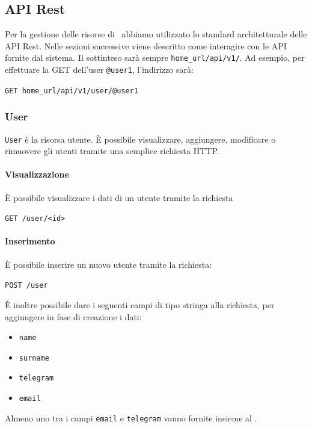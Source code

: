 \subsection{API Rest}\label{APIRest}
\newcommand{\homeUrl}{home\_url}

Per la gestione delle risorse di \progetto\ abbiamo utilizzato lo standard architetturale delle API Rest.
Nelle sezioni successive viene descritto come interagire con le API fornite dal sistema.
Il  sottinteso sarà sempre \texttt{\homeUrl/api/v1/}.
Ad esempio, per effettuare la GET dell'user \texttt{@user1}, l'indirizzo sarà:
\begin{center}
    \texttt{GET \homeUrl/api/v1/user/@user1}
\end{center}

\subsubsection{User}

\texttt{User} è la risorsa utente.
È possibile visualizzare, aggiungere, modificare o rimuovere gli utenti tramite una semplice
richiesta HTTP.

\paragraph{Visualizzazione}
È possibile visualizzare i dati di un utente tramite la richiesta
    \begin{center}
        \texttt{GET  /user/<id>}
    \end{center}

\paragraph{Inserimento}
È possibile inserire un nuovo utente tramite la richiesta:
    \begin{center}
        \texttt{POST /user}
    \end{center}

È inoltre possibile dare i seguenti campi di tipo stringa alla richiesta, per aggiungere in fase di creazione i dati:
\begin{itemize}[noitemsep]
    \item \texttt{name}
    \item \texttt{surname}
    \item \texttt{telegram}
    \item \texttt{email}
\end{itemize}
Almeno uno tra i campi \texttt{email} e \texttt{telegram} vanno fornite insieme al .

